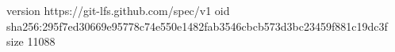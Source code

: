 version https://git-lfs.github.com/spec/v1
oid sha256:295f7ed30669e95778c74e550e1482fab3546cbcb573d3bc23459f881c19dc3f
size 11088
